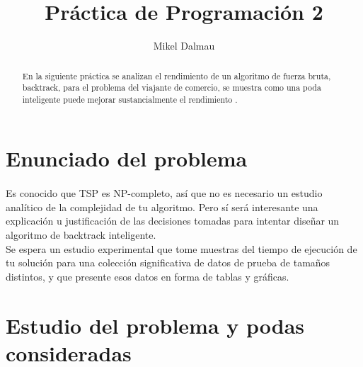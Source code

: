 \documentclass[es]{ifirak}
\begin{document}
\title{Práctica de Programación 2}
\author{Mikel Dalmau}

\maketitle

\begin{abstract}
	\large{En la siguiente práctica se analizan el rendimiento de un algoritmo de fuerza bruta, backtrack, para el problema del viajante de comercio, se muestra como una poda inteligente puede mejorar sustancialmente el rendimiento .
}
\end{abstract}


\section{Enunciado del problema}

\large{
	\paragraph{}Es conocido que TSP es NP-completo, así que no es necesario un estudio analítico de la complejidad de tu algoritmo. Pero sí será interesante una explicación u justificación de las decisiones tomadas para intentar diseñar un algoritmo de backtrack inteligente.\\
	
	Se espera un estudio experimental que tome muestras del tiempo de ejecución de tu solución para una colección significativa de datos de prueba de tamaños distintos, y que presente esos datos en forma de tablas y gráficas.
	
}

\section{Estudio del problema y podas consideradas}
\end{document}
